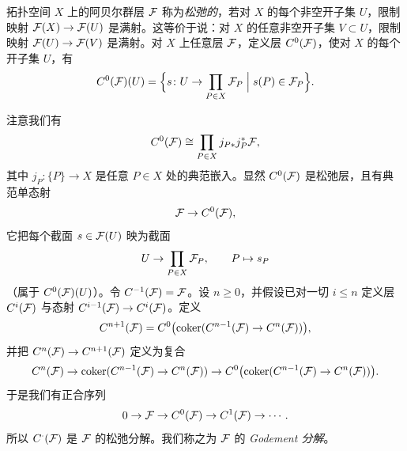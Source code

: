 拓扑空间 $X$ 上的阿贝尔群层 $\mathcal{F}$ 称为\emph{松弛的}，若对 $X$ 的每个非空开子集 $U$，限制映射 $\mathcal{F}(X)\to\mathcal{F}(U)$ 是满射。这等价于说：对 $X$ 的任意非空开子集 $V\subset U$，限制映射 $\mathcal{F}(U)\to\mathcal{F}(V)$ 是满射。对 $X$ 上任意层 $\mathcal{F}$，定义层 $C^0(\mathcal{F})$，使对 $X$ 的每个开子集 $U$，有
\[
C^0(\mathcal{F})(U)=\Bigl\{s\colon U\to\prod_{P\in X}\mathcal{F}_P \Bigm| s(P)\in\mathcal{F}_P\Bigr\}.
\]

注意我们有
\[
C^0(\mathcal{F})\cong\prod_{P\in X}j_{P*}j_P^*\mathcal{F},
\]
其中 $j_P\colon\{P\}\to X$ 是任意 $P\in X$ 处的典范嵌入。显然 $C^0(\mathcal{F})$ 是松弛层，且有典范单态射
\[
\mathcal{F}\to C^0(\mathcal{F}),
\]
它把每个截面 $s\in\mathcal{F}(U)$ 映为截面
\[
U\to\prod_{P\in X}\mathcal{F}_P,\qquad P\mapsto s_P
\]
（属于 $C^0(\mathcal{F})(U)$）。令 $C^{-1}(\mathcal{F})=\mathcal{F}$。设 $n\ge0$，并假设已对一切 $i\le n$ 定义层 $C^i(\mathcal{F})$ 与态射 $C^{i-1}(\mathcal{F})\to C^i(\mathcal{F})$。定义
\[
C^{n+1}(\mathcal{F})=C^0\bigl(\operatorname{coker}(C^{n-1}(\mathcal{F})\to C^n(\mathcal{F}))\bigr),
\]
并把 $C^n(\mathcal{F})\to C^{n+1}(\mathcal{F})$ 定义为复合
\[
C^n(\mathcal{F})\to\operatorname{coker}(C^{n-1}(\mathcal{F})\to C^n(\mathcal{F}))\to C^0\bigl(\operatorname{coker}(C^{n-1}(\mathcal{F})\to C^n(\mathcal{F}))\bigr).
\]
于是我们有正合序列
\[
0\to\mathcal{F}\to C^0(\mathcal{F})\to C^1(\mathcal{F})\to\cdots.
\]
所以 $C^\cdot(\mathcal{F})$ 是 $\mathcal{F}$ 的松弛分解。我们称之为 $\mathcal{F}$ 的 \emph{Godement 分解}。

